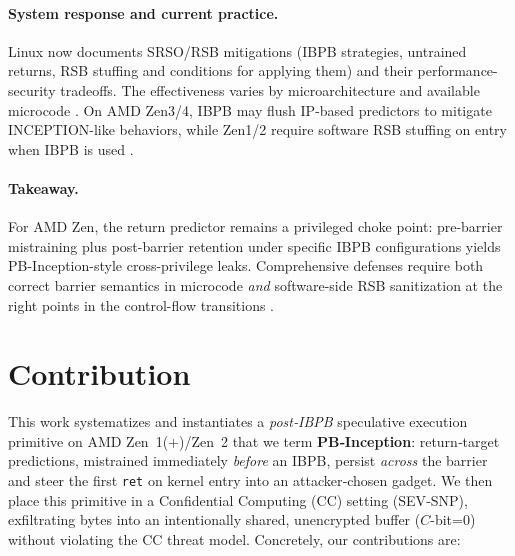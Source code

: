 \documentclass[11pt,a4paper]{article}
\begin{document}
\paragraph{System response and current practice.}
Linux now documents SRSO/RSB mitigations (IBPB strategies, untrained returns, RSB stuffing and conditions for applying them) and their performance-security tradeoffs. The effectiveness varies by microarchitecture and available microcode \cite{linux_srso_doc,linux_rsb_doc}. On AMD Zen3/4, IBPB may flush IP-based predictors to mitigate INCEPTION-like behaviors, while Zen1/2 require software RSB stuffing on entry when IBPB is used \cite{wikner2025breaking,amd_srso_whitepaper}.

\paragraph{Takeaway.}
For AMD Zen, the return predictor remains a privileged choke point: pre-barrier mistraining plus post-barrier retention under specific IBPB configurations yields PB-Inception-style cross-privilege leaks. Comprehensive defenses require both correct barrier semantics in microcode \emph{and} software-side RSB sanitization at the right points in the control-flow transitions \cite{wikner2025breaking,trujillo2023inception,linux_srso_doc}.

\section{Contribution}

This work systematizes and instantiates a \emph{post‑IBPB} speculative execution primitive on AMD Zen~1(+)/Zen~2 that we term \textbf{PB‑Inception}: return‑target predictions, mistrained immediately \emph{before} an IBPB, persist \emph{across} the barrier and steer the first \texttt{ret} on kernel entry into an attacker‑chosen gadget. We then place this primitive in a Confidential Computing (CC) setting (SEV‑SNP), exfiltrating bytes into an intentionally shared, unencrypted buffer (\(C\)-bit=0) without violating the CC threat model. Concretely, our contributions are:
\end{document}
